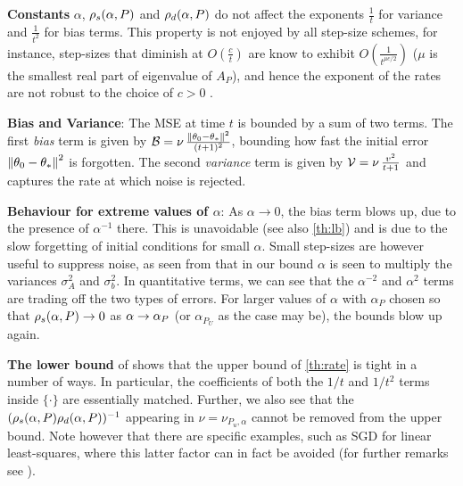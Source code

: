 \textbf{Constants} {$\alpha$, $\rho_s(\alpha,P)$ and $\rho_d(\alpha,P)$} do not affect the exponents $\frac{1}{t}$ for variance and $\frac{1}{t^2}$ for bias terms. This property is not enjoyed by all step-size schemes, for instance, step-sizes that diminish at $O(\frac{c}{t})$ are know to exhibit $O(\frac{1}{t^{\mu c/2}})$ ($\mu$ is the smallest real part of eigenvalue of $A_P$), and hence the exponent of the rates are not robust to the choice of $c>0$ \cite{bach-moulines,korda-prashanth}.

\textbf{Bias and Variance}: The MSE at time $t$ is bounded by a sum of two terms. The first \emph{bias} term is given by $\mathcal{B}=\nu \,\frac{\left\| \theta_0-\theta_*\right\|^2}{(t+1)^2}$, bounding how fast the initial error $\left\| \theta_0-\theta_*\right\|^2$ is forgotten. 
The second \emph{variance} term is  given by $\mathcal{V}=\nu\, \frac{v^2}{t+1} $ and captures the rate at which noise is rejected.

\textbf{Behaviour for extreme values of $\alpha$}: 
As $\alpha\to 0$, the bias term blows up, due to the presence of $\alpha^{-1}$ there. This is unavoidable (see also \cref{th:lb}) and is due to the slow forgetting of initial conditions for small $\alpha$. Small step-sizes are however useful to suppress noise, as seen from that in our bound $\alpha$ is seen to multiply the variances $\sigma^2_A$ and $\sigma^2_b$. In quantitative terms, we can see that the $\alpha^{-2}$ and $\alpha^2$ terms are trading off the two types of errors. 
For larger values of $\alpha$ with $\alpha_P$ chosen so that $\rho_s(\alpha,P)\rightarrow 0$ as $\alpha\rightarrow \alpha_{P}$  (or $\alpha_{P_U}$ as the case may be), the bounds blow up again.

\textbf{The lower bound} of  shows that the upper bound of \cref{th:rate} is tight in a number of ways.
In particular, the coefficients of both the $1/t$ and $1/t^2$ terms inside $\{ \cdot \}$ are essentially matched.
Further, we also see that
the $(\rho_s(\alpha,P)\rho_d(\alpha,P))^{-1}$ appearing in $\nu = \nu_{P_u,\alpha}$ cannot be removed from the upper bound. 
Note however that there are specific examples, such as SGD for linear least-squares,
where this latter factor can in fact be avoided (for further remarks see ).

%

